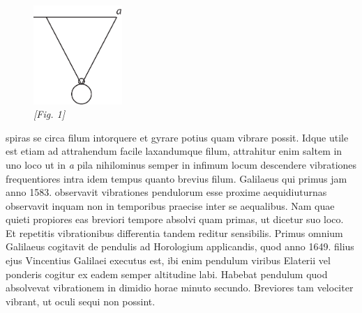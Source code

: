             \begin{figure}                    
         \begin{center}
                \includegraphics[width=0.3\textwidth]{images/35_14_2_134v}\\\textit{[Fig. 1]} 
                        \end{center}
                        \end{figure}
               spiras se circa filum intorquere  et gyrare potius quam vibrare possit. Idque utile est etiam  ad attrahendum facile laxandumque filum, attrahitur  enim saltem in uno loco ut in \textit{a} pila\protect{} nihilominus semper in infimum  locum descendere vibrationes frequentiores intra idem tempus  quanto brevius filum. Galilaeus\protect{} qui primus jam  anno 1583. observavit vibrationes pendulorum\protect{} esse proxime aequidiuturnas observavit inquam non  in temporibus  praecise inter se aequalibus. Nam quae quieti propiores eas breviori  tempore absolvi quam primas, ut dicetur suo loco. Et repetitis vibrationibus differentia tandem reditur sensibilis. Primus omnium Galilaeus\protect{} cogitavit de pendulis\protect{} ad Horologium\protect{} applicandis, quod anno 1649. filius ejus Vincentius\protect{} Galilaei \protect{} executus est, ibi enim pendulum\protect{} viribus Elaterii\protect{} vel ponderis cogitur ex eadem semper altitudine labi. Habebat pendulum\protect{} quod absolvevat vibrationem in dimidio horae minuto secundo. Breviores tam velociter vibrant, ut oculi sequi non possint.\pend 
